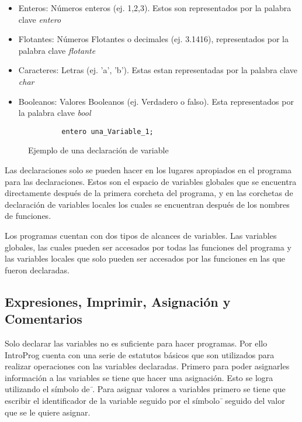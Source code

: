 \begin{itemize}
    \item Enteros: Números enteros (ej. 1,2,3).  Estos son representados por la palabra clave \emph{entero}
    \item Flotantes: Números Flotantes o decimales (ej. 3.1416), representados por la palabra clave \emph{flotante} 
    \item Caracteres: Letras (ej. 'a', 'b'). Estas estan representadas por la palabra clave \emph{char}
    \item Booleanos: Valores Booleanos (ej. Verdadero o falso). Esta representados por la palabra clave \emph{bool}
\end{itemize}

\begin{figure}[!htbp]
    \centering
    
    \begin{lstlisting}
        entero una_Variable_1;
    \end{lstlisting}
    \caption{Ejemplo de una declaración de variable}
\end{figure}
\FloatBarrier
Las declaraciones solo se pueden hacer en los lugares apropiados en el programa para las declaraciones. Estos son el espacio de variables globales que se encuentra directamente después de la primera corcheta del programa, y en las corchetas de declaración de variables locales los cuales se encuentran después de los nombres de funciones.

Los programas cuentan con dos tipos de alcances de variables. Las variables globales, las cuales pueden ser accesados por todas las funciones del programa y las variables locales que solo pueden ser accesados por las funciones en las que fueron declaradas.

\subsection{Expresiones, Imprimir, Asignación y Comentarios}

Solo declarar las variables no es suficiente para hacer programas. Por ello IntroProg cuenta con una serie de estatutos básicos que son utilizados para realizar operaciones con las variables declaradas. Primero para poder asignarles información a las variables se tiene que hacer una asignación. Esto se logra utilizando el símbolo de \emph{\=}. Para asignar valores a variables primero se tiene que escribir el identificador de la variable seguido por el símbolo \emph{\=} seguido del valor que se le quiere asignar.

